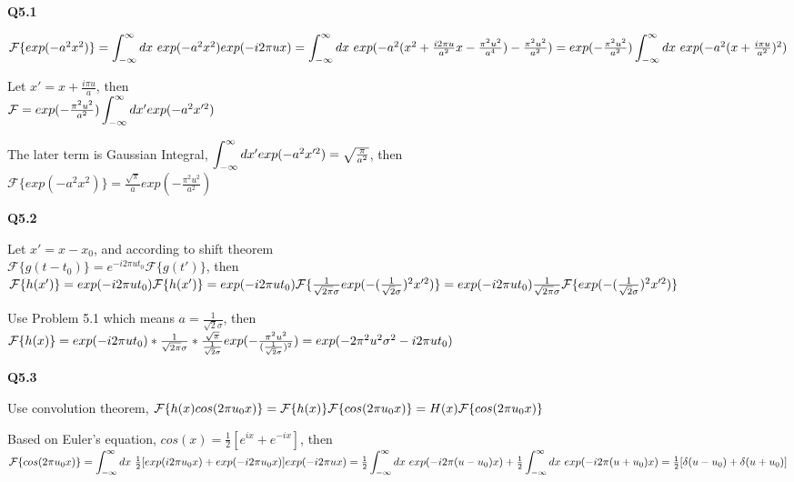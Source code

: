 \documentclass[12pt,a4paper]{article}
\newcommand{\infint}{\mathop{\mathlarger{\int_{-\infty}^\infty}}}
\begin{document}
    \Large{\textbf{Q5.1}}

    $\mathcal{F}\{exp(-a^2x^2)\}=\infint dx\ exp(-a^2x^2)exp(-i2\pi ux)\\
    =\infint dx\ exp(-a^2(x^2+\frac{i2\pi u}{a^2}x-\frac{\pi^2u^2}{a^4})-\frac{\pi^2u^2}{a^2})\\
    =exp(-\frac{\pi^2u^2}{a^2})\infint dx\ exp(-a^2(x+\frac{i\pi u}{a^2})^2)$

    \vspace{0.5cm}
    \noindent Let $x' = x+\frac{i\pi u}{a}$, then\\
    $\mathcal{F}=exp(-\frac{\pi^2u^2}{a^2})\infint dx' exp(-a^2x'^2)$
    
    \vspace{0.5cm}
    \noindent The later term is Gaussian Integral, $\infint dx' exp(-a^2x'^2)=\sqrt{\frac{\pi}{a^2}}$, then\\
    $\mathcal{F}\{exp(-a^2x^2)\}=\frac{\sqrt{\pi}}{a}exp(-\frac{\pi^2u^2}{a^2})$

    \newpage
    \Large{\textbf{Q5.2}}
    
    \noindent Let $x'=x-x_0$, and according to shift theorem\\ $\mathcal{F}\{g(t-t_0)\}=e^{-i2\pi ut_0}\mathcal{F}\{g(t')\}$, then \\
    $\mathcal{F}\{h(x')\}=exp(-i2\pi ut_0)\mathcal{F}\{h(x')\}=exp(-i2\pi ut_0)\mathcal{F}\{\frac{1}{\sqrt{2\pi}\sigma}exp(-(\frac{1}{\sqrt{2}\sigma})^2x'^2)\}\\
    =exp(-i2\pi ut_0)\frac{1}{\sqrt{2\pi}\sigma} \mathcal{F}\{exp(-(\frac{1}{\sqrt{2}\sigma})^2x'^2)\}$

    \noindent Use Problem 5.1 which means $a=\frac{1}{\sqrt{2}\sigma}$, then \\ 
    $\mathcal{F}\{h(x)\}=exp(-i2\pi ut_0)*\frac{1}{\sqrt{2\pi}\sigma}*\frac{\sqrt{\pi}}{\frac{1}{\sqrt{2}\sigma}}exp(-\frac{\pi^2u^2}{(\frac{1}{\sqrt{2}\sigma})^2})\\
    =exp(-2\pi^2u^2\sigma^2-i2\pi ut_0)$

    \newpage
    \Large{\textbf{Q5.3}}

    Use convolution theorem, $\mathcal{F}\{h(x)cos(2\pi u_0x)\}=\mathcal{F}\{h(x)\}\mathcal{F}\{cos(2\pi u_0 x)\}\\
    =H(x)\mathcal{F}\{cos(2\pi u_0 x)\}$

    \noindent Based on Euler's equation, $cos(x)=\frac{1}{2}[e^{ix}+e^{-ix}]$, then\\
    $\mathcal{F}\{cos(2\pi u_0 x)\}=\infint dx\ \frac{1}{2}[exp(i2\pi u_0 x)+exp(-i2\pi u_0 x)]exp(-i2\pi u x)\\
    =\frac{1}{2}\infint dx\ exp(-i2\pi(u-u_0)x)+\frac{1}{2}\infint dx\ exp(-i2\pi(u+u_0)x)\\
    =\frac{1}{2}[\delta(u-u_0)+\delta(u+u_0)]$
\end{document}
